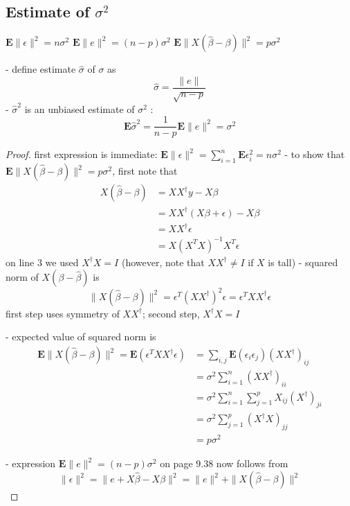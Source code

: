 \subsection{Estimate of $ \sigma^{2} $}


$ \mathbf{E}\|\epsilon\|^{2}=n \sigma^{2} $
$ \mathbf{E}\|e\|^{2}=(n-p) \sigma^{2} $
$ \mathbf{E}\|X(\hat{\beta}-\beta)\|^{2}=p \sigma^{2} $

- define estimate $ \hat{\sigma} $ of $ \sigma $ as
$$
\hat{\sigma}=\frac{\|e\|}{\sqrt{n-p}}
$$
- $ \hat{\sigma}^{2} $ is an unbiased estimate of $ \sigma^{2} $ :
$$
\mathbf{E} \hat{\sigma}^{2}=\frac{1}{n-p} \mathbf{E}\|e\|^{2}=\sigma^{2}
$$

\begin{proof}
    first expression is immediate: $ \mathbf{E}\|\epsilon\|^{2}=\sum_{i=1}^{n} \mathbf{E} \epsilon_{i}^{2}=n \sigma^{2} $
- to show that $ \mathbf{E}\|X(\hat{\beta}-\beta)\|^{2}=p \sigma^{2} $, first note that
$$
\begin{aligned}
X(\hat{\beta}-\beta) &=X X^{\dagger} y-X \beta \\
&=X X^{\dagger}(X \beta+\epsilon)-X \beta \\
&=X X^{\dagger} \epsilon \\
&=X\left(X^{T} X\right)^{-1} X^{T} \epsilon
\end{aligned}
$$
on line 3 we used $ X^{\dagger} X=I $ (however, note that $ X X^{\dagger} \neq I $ if $ X $ is tall)
- squared norm of $ X(\beta-\hat{\beta}) $ is
$$
\|X(\hat{\beta}-\beta)\|^{2}=\epsilon^{T}\left(X X^{\dagger}\right)^{2} \epsilon=\epsilon^{T} X X^{\dagger} \epsilon
$$
first step uses symmetry of $ X X^{\dagger} $; second step, $ X^{\dagger} X=I $

- expected value of squared norm is
$$
\begin{aligned}
\mathbf{E}\|X(\hat{\beta}-\beta)\|^{2}=\mathbf{E}\left(\epsilon^{T} X X^{\dagger} \epsilon\right) &=\sum_{i, j} \mathbf{E}\left(\epsilon_{i} \epsilon_{j}\right)\left(X X^{\dagger}\right)_{i j} \\
&=\sigma^{2} \sum_{i=1}^{n}\left(X X^{\dagger}\right)_{i i} \\
&=\sigma^{2} \sum_{i=1}^{n} \sum_{j=1}^{p} X_{i j}\left(X^{\dagger}\right)_{j i} \\
&=\sigma^{2} \sum_{j=1}^{p}\left(X^{\dagger} X\right)_{j j} \\
&=p \sigma^{2}
\end{aligned}
$$

- expression $ \mathbf{E}\|e\|^{2}=(n-p) \sigma^{2} $ on page $ 9.38 $ now follows from
$$
\|\epsilon\|^{2}=\|e+X \hat{\beta}-X \beta\|^{2}=\|e\|^{2}+\|X(\hat{\beta}-\beta)\|^{2}
$$
\end{proof}


